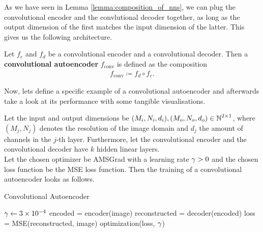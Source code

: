 As we have seen in Lemma \ref{lemma:composition_of_nns}, we can plug the convolutional encoder and the convlutional decoder together, as long as the output dimension of the first matches the input dimension of the latter. This gives us the following architecture.

\begin{definition}
Let $f_e$ and $f_d$ be a convolutional encoder and a convolutional decoder. Then a \textbf{convolutional autoencoder} $f_{\text{conv}}$ is defined as the composition
\begin{align*}
f_{\text{conv}} \coloneqq f_d \circ f_e.
\end{align*}
\end{definition}

Now, lets define a specific example of a convolutional autoencoder and afterwards take a look at its performance with some tangible visualisations.

\begin{algorithm}
Let the input and output dimensions be $(M_i,N_i, d_i), (M_o,N_o,d_o) \in \operatorname{\mathbb{N}}^{2\times 1}$, where $(M_j, N_j)$ denotes the resolution of the image domain and $d_j$ the amount of channels in the $j$-th layer. Furthermore, let the convolutional encoder and the convolutional decoder have $k$ hidden linear layers.\\
Let the chosen optimizer be AMSGrad with a learning rate $\operatorname{\gamma}>0$ and the chosen loss function be the MSE loss function. Then the training of a convolutional autoencoder looks as follows.
\caption{Convolutional Autoencoder}\label{alg:convolutional_AE}
\begin{algorithmic}[1]
\Require $\operatorname{\gamma} \gets \num{3e-4}$
	    \State encoded = encoder(image) 
		\State reconstructed = decoder(encoded) 
    	\State loss = MSE(reconstructed, image) 
	    \State optimization(loss, $\operatorname{\gamma}$) 
    \EndFor
\EndFor
\end{algorithmic}
\end{algorithm}

